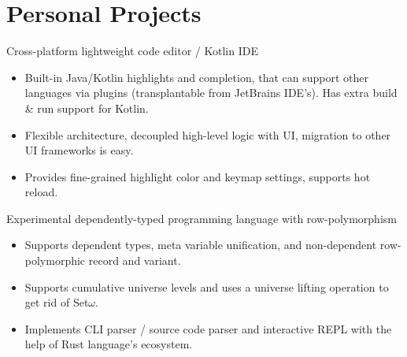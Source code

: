 \documentclass{resume}
\begin{document}

\section{Personal Projects}

Cross-platform lightweight code editor / Kotlin IDE
\begin{itemize}
  \item Built-in Java/Kotlin highlights and completion, that can support other languages
    via plugins (transplantable from JetBrains IDE's).
    Has extra build \& run support for Kotlin.
  \item Flexible architecture, decoupled high-level logic with UI, migration to other UI frameworks is easy.
  \item Provides fine-grained highlight color and keymap settings, supports hot reload.
\end{itemize}

Experimental dependently-typed programming language with row-polymorphism
\begin{itemize}
  \item Supports dependent types, meta variable unification, and non-dependent row-polymorphic record and variant.
  \item Supports cumulative universe levels and uses a universe lifting operation to get rid of Set$\omega$.
  \item Implements CLI parser / source code parser and interactive REPL with the help of Rust language's ecosystem.
\end{itemize}
\end{document}

